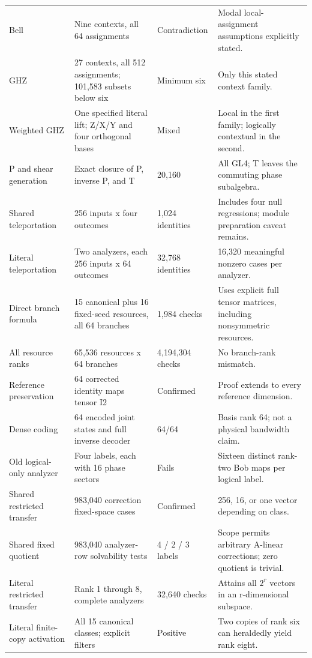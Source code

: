 \begin{longtable}{@{}L{29mm}L{53mm}L{21mm}L{45mm}@{}}
Bell & Nine contexts, all 64 assignments & Contradiction & Modal local-assignment assumptions explicitly stated.\\
GHZ & 27 contexts, all 512 assignments; 101,583 subsets below six & Minimum six & Only this stated context family.\\
Weighted GHZ & One specified literal lift; Z/X/Y and four orthogonal bases & Mixed & Local in the first family; logically contextual in the second.\\
P and shear generation & Exact closure of P, inverse P, and T & 20,160 & All GL4; T leaves the commuting phase subalgebra.\\
Shared teleportation & 256 inputs x four outcomes & 1,024 identities & Includes four null regressions; module preparation caveat remains.\\
Literal teleportation & Two analyzers, each 256 inputs x 64 outcomes & 32,768 identities & 16,320 meaningful nonzero cases per analyzer.\\
Direct branch formula & 15 canonical plus 16 fixed-seed resources, all 64 branches & 1,984 checks & Uses explicit full tensor matrices, including nonsymmetric resources.\\
All resource ranks & 65,536 resources x 64 branches & 4,194,304 checks & No branch-rank mismatch.\\
Reference preservation & 64 corrected identity maps tensor I2 & Confirmed & Proof extends to every reference dimension.\\
Dense coding & 64 encoded joint states and full inverse decoder & 64/64 & Basis rank 64; not a physical bandwidth claim.\\
Old logical-only analyzer & Four labels, each with 16 phase sectors & Fails & Sixteen distinct rank-two Bob maps per logical label.\\
Shared restricted transfer & 983,040 correction fixed-space cases & Confirmed & 256, 16, or one vector depending on class.\\
Shared fixed quotient & 983,040 analyzer-row solvability tests & 4 / 2 / 3 labels & Scope permits arbitrary A-linear corrections; zero quotient is trivial.\\
Literal restricted transfer & Rank 1 through 8, complete analyzers & 32,640 checks & Attains all $2^r$ vectors in an r-dimensional subspace.\\
Literal finite-copy activation & All 15 canonical classes; explicit filters & Positive & Two copies of rank six can heraldedly yield rank eight.\\

\end{longtable}
